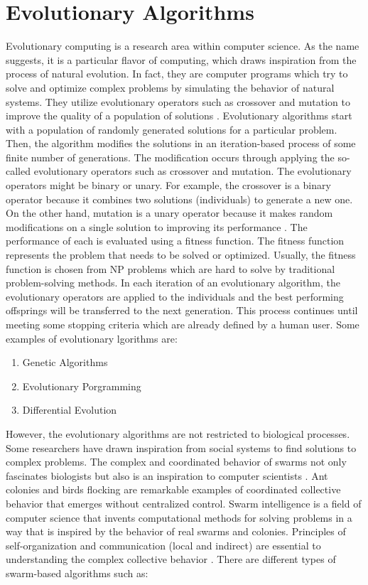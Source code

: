 \section{Evolutionary Algorithms}
Evolutionary computing is a research area within computer science. As the name suggests, it is a particular flavor of computing, which draws inspiration from the process of natural evolution. In fact, they are computer programs which try to solve and optimize complex problems by simulating the behavior of natural systems. They utilize evolutionary operators such as crossover and mutation to improve the quality of a population of solutions \citet{burke2005search}. \newline
Evolutionary algorithms start with a population of randomly generated solutions for a particular problem. Then, the algorithm modifies the solutions in an iteration-based process of some finite number of generations. The modification occurs through applying the so-called evolutionary operators such as crossover and mutation. The evolutionary operators might be binary or unary. For example, the crossover is a binary operator because it combines two solutions (individuals) to generate a new one. On the other hand, mutation is a unary operator because it makes random modifications on a single solution to improving its performance \citet{eiben2003introduction}. The performance of each is evaluated using a fitness function. The fitness function represents the problem that needs to be solved or optimized. Usually, the fitness function is chosen from NP problems which are hard to solve by traditional problem-solving methods. In each iteration of an evolutionary algorithm, the evolutionary operators are applied to the individuals and the best performing offsprings will be transferred to the next generation. This process continues until meeting some stopping criteria which are already defined by a human user. Some examples of evolutionary lgorithms are:
\begin{enumerate}
	\item Genetic Algorithms
	\item Evolutionary Porgramming
	\item Differential Evolution
\end{enumerate}
However, the evolutionary algorithms are not restricted to biological processes. Some researchers have drawn inspiration from social systems to find solutions to complex problems. The complex and coordinated behavior of swarms not only fascinates biologists but also is an inspiration to computer scientists \citet{bonabeau1999swarm}. Ant colonies and birds flocking are remarkable examples of coordinated collective behavior that emerges without centralized control. Swarm intelligence is a field of computer science that invents computational methods for solving problems in a way that is inspired by the behavior of real swarms and colonies. Principles of self-organization and communication (local and indirect) are essential to understanding the complex collective behavior \citet{stutzle2009ant}. There are different types of swarm-based algorithms such as:

